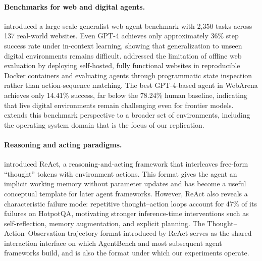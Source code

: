 \documentclass[11pt]{article}
\begin{document}
\paragraph{Benchmarks for web and digital agents.}
\citet{deng2023mind2web} introduced a large-scale generalist web agent
benchmark with 2,350 tasks across 137 real-world websites. Even GPT-4
achieves only approximately 36\% step success rate under in-context
learning, showing that generalization to unseen digital environments remains
difficult. \citet{zhou2023webarena} addressed the limitation of offline web
evaluation by deploying self-hosted, fully functional websites in
reproducible Docker containers and evaluating agents through programmatic
state inspection rather than action-sequence matching. The best GPT-4-based
agent in WebArena achieves only 14.41\% success, far below the 78.24\%
human baseline, indicating that live digital environments remain challenging
even for frontier models. \citet{liu2023agentbench} extends this benchmark
perspective to a broader set of environments, including the operating
system domain that is the focus of our replication.

\paragraph{Reasoning and acting paradigms.}
\citet{yao2022react} introduced ReAct, a reasoning-and-acting framework
that interleaves free-form ``thought'' tokens with environment actions.
This format gives the agent an implicit working memory without parameter
updates and has become a useful conceptual template for later agent
frameworks. However, ReAct also reveals a characteristic failure mode:
repetitive thought--action loops account for 47\% of its failures on
HotpotQA, motivating stronger inference-time interventions such as
self-reflection, memory augmentation, and explicit planning. The
Thought--Action--Observation trajectory format introduced by ReAct serves
as the shared interaction interface on which AgentBench and most
subsequent agent frameworks build, and is also the format under which our
experiments operate.
\end{document}
